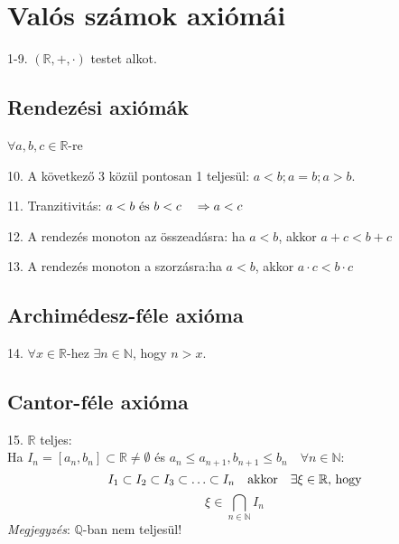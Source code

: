 \documentclass[a4paper,12pt,twoside]{book}
\theoremstyle{break}
\theoremstyle{plain}
\begin{document}
\section{Valós számok axiómái}

\begin{description*}
 \item[1-9.] $(\mathbb{R}, +, \cdot)$ testet alkot.
\end{description*}

\subsection{Rendezési axiómák}

$\forall a,b,c \in \mathbb{R}$-re
\begin{description*}
 \item[10.] A következő 3 közül pontosan 1 teljesül: $a<b; a=b; a>b$.
 \item[11.] Tranzitivitás: $a<b \hbox{ és } b<c \quad \Rightarrow a<c$
 \item[12.] A rendezés monoton az összeadásra: ha $a<b$, akkor $a+c < b+c$
 \item[13.] A rendezés monoton a szorzásra:ha $a<b$, akkor $a\cdot c < b\cdot c$
\end{description*}

\subsection{Archimédesz-féle axióma}

\begin{description*}
 \item[14.] $\forall x\in \mathbb{R}$-hez $\exists n\in\mathbb{N}$, hogy $n>x$.
\end{description*}

\subsection{Cantor-féle axióma}

\begin{description*}\label{Cantor}
 \item[15.] $\mathbb{R}$ teljes:\\
  Ha $I_n = [a_n, b_n]\subset\mathbb{R} \neq \emptyset$ és $a_n\leqslant a_{n+1}, b_{n+1}\leqslant b_n \quad \forall n\in\mathbb{N}$:
 \[I_1\subset I_2\subset I_3\subset \ldots \subset I_n \quad\hbox{akkor}\quad \exists\xi\in\mathbb{R} \hbox{, hogy}\]
 \[\xi\in\bigcap_{n\in\mathbb{N}} I_n\]
 \emph{Megjegyzés}: $\mathbb{Q}$-ban nem teljesül!
\end{description*}
\end{document}
